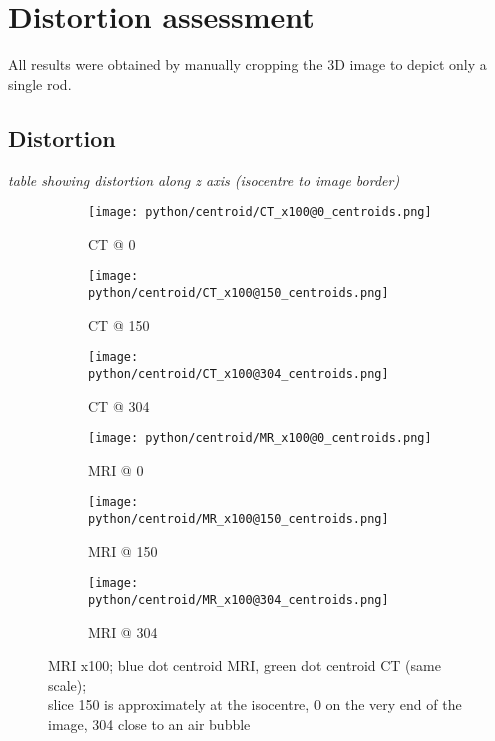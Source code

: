 \section{Distortion assessment}
All results were obtained by manually cropping the 3D image to depict only a single rod.

\subsection{Distortion}

\vspace{4cm}
\textit{table showing distortion along z axis (isocentre to image border)}
\vspace{2cm}

\begin{figure}[!tbp]
  \begin{subfigure}[b]{0.32\textwidth}
    \texttt{[image: python/centroid/CT\_x100@0\_centroids.png]}
    \caption{CT @ 0}
    \label{fig:CT_x100_centroids@0}
  \end{subfigure}
  \begin{subfigure}[b]{0.32\textwidth}
    \texttt{[image: python/centroid/CT\_x100@150\_centroids.png]}
    \caption{CT @ 150}
    \label{fig:CT_x100_centroids@150}
  \end{subfigure}
  \begin{subfigure}[b]{0.32\textwidth}
    \texttt{[image: python/centroid/CT\_x100@304\_centroids.png]}
    \caption{CT @ 304}
    \label{fig:CT_x100_centroids@304}
  \end{subfigure}
  \begin{subfigure}[b]{0.32\textwidth}
    \texttt{[image: python/centroid/MR\_x100@0\_centroids.png]}
    \caption{MRI @ 0}
    \label{fig:MR_x100_centroids@0}
  \end{subfigure}
  \begin{subfigure}[b]{0.32\textwidth}
    \texttt{[image: python/centroid/MR\_x100@150\_centroids.png]}
    \caption{MRI @ 150}
    \label{fig:MR_x100_centroids@150}
  \end{subfigure}
  \begin{subfigure}[b]{0.32\textwidth}
    \texttt{[image: python/centroid/MR\_x100@304\_centroids.png]}
    \caption{MRI @ 304}
    \label{fig:MR_x100_centroids@304}
  \end{subfigure}
  \caption{MRI x100; blue dot centroid MRI, green dot centroid CT (same scale);\\ slice 150 is approximately at the isocentre, 0 on the very end of the image, 304 close to an air bubble}
  \label{fig:MR_x100_centroids}
\end{figure}

